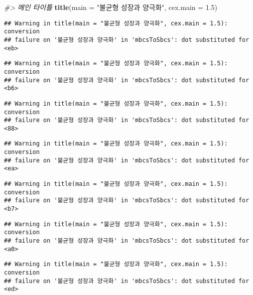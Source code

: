 \documentclass[
]{article}
\newenvironment{Shaded}{\begin{snugshade}}{\end{snugshade}}
\newcommand{\CommentTok}[1]{\textcolor[rgb]{0.56,0.35,0.01}{\textit{#1}}}
\newcommand{\DataTypeTok}[1]{\textcolor[rgb]{0.13,0.29,0.53}{#1}}
\newcommand{\FloatTok}[1]{\textcolor[rgb]{0.00,0.00,0.81}{#1}}
\newcommand{\KeywordTok}[1]{\textcolor[rgb]{0.13,0.29,0.53}{\textbf{#1}}}
\newcommand{\NormalTok}[1]{#1}
\newcommand{\StringTok}[1]{\textcolor[rgb]{0.31,0.60,0.02}{#1}}
\begin{document}
\begin{Shaded}
\begin{Highlighting}[]
\CommentTok{#> 메인 타이틀 }
\KeywordTok{title}\NormalTok{(}\DataTypeTok{main =} \StringTok{"불균형 성장과 양극화"}\NormalTok{, }
      \DataTypeTok{cex.main =} \FloatTok{1.5}\NormalTok{)}
\end{Highlighting}
\end{Shaded}

\begin{verbatim}
## Warning in title(main = "불균형 성장과 양극화", cex.main = 1.5): conversion
## failure on '불균형 성장과 양극화' in 'mbcsToSbcs': dot substituted for <eb>
\end{verbatim}

\begin{verbatim}
## Warning in title(main = "불균형 성장과 양극화", cex.main = 1.5): conversion
## failure on '불균형 성장과 양극화' in 'mbcsToSbcs': dot substituted for <b6>
\end{verbatim}

\begin{verbatim}
## Warning in title(main = "불균형 성장과 양극화", cex.main = 1.5): conversion
## failure on '불균형 성장과 양극화' in 'mbcsToSbcs': dot substituted for <88>
\end{verbatim}

\begin{verbatim}
## Warning in title(main = "불균형 성장과 양극화", cex.main = 1.5): conversion
## failure on '불균형 성장과 양극화' in 'mbcsToSbcs': dot substituted for <ea>
\end{verbatim}

\begin{verbatim}
## Warning in title(main = "불균형 성장과 양극화", cex.main = 1.5): conversion
## failure on '불균형 성장과 양극화' in 'mbcsToSbcs': dot substituted for <b7>
\end{verbatim}

\begin{verbatim}
## Warning in title(main = "불균형 성장과 양극화", cex.main = 1.5): conversion
## failure on '불균형 성장과 양극화' in 'mbcsToSbcs': dot substituted for <a0>
\end{verbatim}

\begin{verbatim}
## Warning in title(main = "불균형 성장과 양극화", cex.main = 1.5): conversion
## failure on '불균형 성장과 양극화' in 'mbcsToSbcs': dot substituted for <ed>
\end{verbatim}
\end{document}
